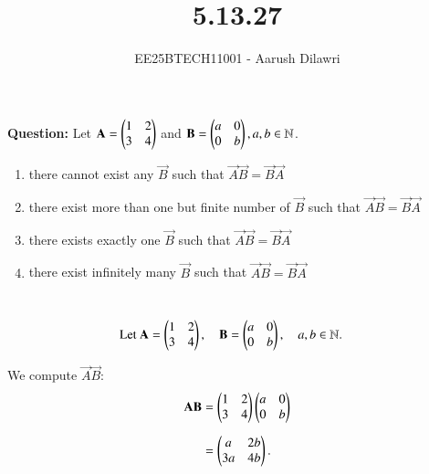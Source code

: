 \documentclass[journal]{IEEEtran}
\begin{document}

\vspace{3cm}

\title{5.13.27}
\author{EE25BTECH11001 - Aarush Dilawri}
\maketitle
{\let\newpage\relax\maketitle}

\renewcommand{\thefigure}{\theenumi}
\renewcommand{\thetable}{\theenumi}
\setlength{\intextsep}{10pt} %


\renewcommand{\thetable}{\theenumi}

\textbf{Question:} Let $\mathbf{A}=\begin{pmatrix}1 & 2 \\ 3 & 4\end{pmatrix}$ and $\mathbf{B} = \begin{pmatrix}a & 0 \\ 0 & b\end{pmatrix}, a,b \in \mathbb{N}$.


\begin{enumerate}[label=(\alph*)]
    \item there cannot exist any $\vec{B}$ such that $\vec{A}\vec{B} = \vec{B}\vec{A}$
    \item there exist more than one but finite number of $\vec{B}$ such that $\vec{A}\vec{B} = \vec{B}\vec{A}$
    \item there exists exactly one $\vec{B}$ such that $\vec{A}\vec{B} = \vec{B}\vec{A}$
    \item there exist infinitely many $\vec{B}$ such that $\vec{A}\vec{B} = \vec{B}\vec{A}$
\end{enumerate}


\solution \\
\begin{align}
\text{Let } \mathbf{A} &= \begin{pmatrix}1 & 2 \\ 3 & 4\end{pmatrix}, \quad 
\mathbf{B} = \begin{pmatrix}a & 0 \\ 0 & b\end{pmatrix}, \quad a,b \in \mathbb{N}.
\end{align}

We compute $\vec{A}\vec{B}$:
\begin{align}
\mathbf{A}\mathbf{B} 
&= \begin{pmatrix}1 & 2 \\ 3 & 4\end{pmatrix} \begin{pmatrix}a & 0 \\ 0 & b\end{pmatrix} \\[6pt]
&= \begin{pmatrix}a & 2b \\ 3a & 4b\end{pmatrix}.
\end{align}
\end{document}
